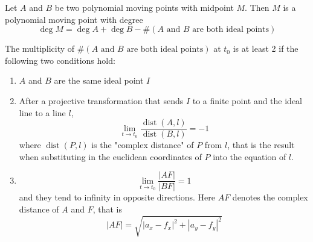 \documentclass[a4paper]{article}
\begin{document}
\begin{theorem}
    Let $A$ and $B$ be two polynomial moving points with midpoint $M$. Then $M$ is a polynomial moving point with degree
    $$\deg M=\deg A+ \deg B - \#(A \text{ and } B \text{ are both ideal points})$$
\end{theorem}
\begin{remark}
    The multiplicity of $\#(A \text{ and } B \text{ are both ideal points})$ at $t_0$ is at least 2 if the following two conditions hold:
    \begin{enumerate}
        \item $A$ and $B$ are the same ideal point $I$
        \item After a projective transformation that sends $I$ to a finite point and the ideal line to a line $l$, $$\lim_{t\rightarrow t_0} \frac{\operatorname{dist}(A,l)}{\operatorname{dist}(B,l)}=-1$$where $\operatorname{dist}(P,l)$ is the "complex distance" of $P$ from $l$, that is the result when substituting in the euclidean coordinates of $P$ into the equation of $l$.
        \item $$\lim_{t\rightarrow t_0} \frac{|AF|}{|BF|}=1$$ and they tend to infinity in opposite directions. Here $AF$ denotes the complex distance of $A$ and $F$, that is
        $$|AF|=\sqrt{|a_x-f_x|^2+|a_y-f_y|^2}$$
    \end{enumerate}



\end{remark}
\end{document}
